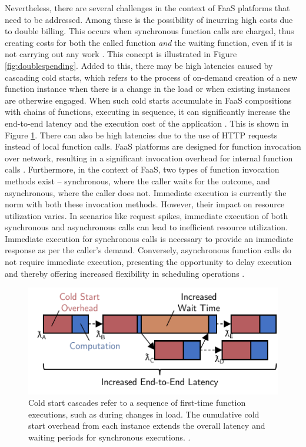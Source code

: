 Nevertheless, there are several challenges in the context of FaaS platforms that
need to be addressed. Among these is the possibility of incurring high costs due
to double billing. This occurs when synchronous function calls are charged, thus
creating costs for both the called function \emph{and} the waiting function,
even if it is not carrying out any work \cite{baldini2017serverless}. This
concept is illustrated in Figure \ref{fig:doublespending}. Added to this, there
may be high latencies caused by cascading cold starts, which refers to the
process of on-demand creation of a new function instance when there is a change
in the load or when existing instances are otherwise engaged. When such cold
starts accumulate in FaaS compositions with chains of functions, executing in
sequence, it can significantly increase the end-to-end latency and the execution
cost of the application \cite{bermbach2020using, daw2020xanadu}. This is shown
in Figure \ref{fig:cascading_cold_start}. There can also be high latencies due
to the use of HTTP requests instead of local function calls. FaaS platforms are
designed for function invocation over network, resulting in a significant
invocation overhead for internal function calls \cite{jia2021nightcore,
qi2022spright}. Furthermore, in the context of FaaS, two types of function
invocation methods exist -- synchronous, where the caller waits for the outcome,
and asynchronous, where the caller does not. Immediate execution is currently
the norm with both these invocation methods. However, their impact on resource
utilization varies. In scenarios like request spikes, immediate execution of
both synchronous and asynchronous calls can lead to inefficient resource
utilization. Immediate execution for synchronous calls is necessary to provide
an immediate response as per the caller's demand. Conversely, asynchronous
function calls do not require immediate execution, presenting the opportunity to
delay execution and thereby offering increased flexibility in scheduling
operations \cite{schirmer2023profaastinate}.

\begin{figure}
    \centering
    \includegraphics[width=.9\linewidth]{../figures/cascadingcoldstart}
    \caption{
        Cold start cascades refer to a sequence of first-time function
        executions, such as during changes in load. The cumulative cold start
        overhead from each instance extends the overall latency and waiting
        periods for synchronous executions. \cite{bermbach2020using}.
    }
    \label{fig:cascading_cold_start}
\end{figure}

